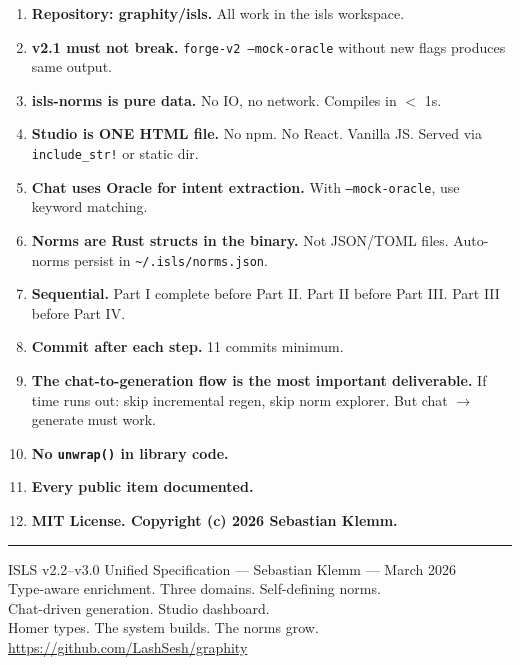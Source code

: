 \documentclass[11pt,a4paper]{article}
\begin{document}
\begin{enumerate}
\item \textbf{Repository: graphity/isls.} All work in the isls workspace.
\item \textbf{v2.1 must not break.} \texttt{forge-v2 --mock-oracle}
  without new flags produces same output.
\item \textbf{isls-norms is pure data.} No IO, no network. Compiles
  in $<$ 1s.
\item \textbf{Studio is ONE HTML file.} No npm. No React. Vanilla JS.
  Served via \texttt{include\_str!} or static dir.
\item \textbf{Chat uses Oracle for intent extraction.} With
  \texttt{--mock-oracle}, use keyword matching.
\item \textbf{Norms are Rust structs in the binary.} Not JSON/TOML
  files. Auto-norms persist in \texttt{\textasciitilde/.isls/norms.json}.
\item \textbf{Sequential.} Part I complete before Part II. Part II
  before Part III. Part III before Part IV.
\item \textbf{Commit after each step.} 11 commits minimum.
\item \textbf{The chat-to-generation flow is the most important
  deliverable.} If time runs out: skip incremental regen, skip
  norm explorer. But chat $\to$ generate must work.
\item \textbf{No \texttt{unwrap()} in library code.}
\item \textbf{Every public item documented.}
\item \textbf{MIT License. Copyright (c) 2026 Sebastian Klemm.}
\end{enumerate}

\vfill
\noindent\rule{\textwidth}{0.4pt}
\begin{center}
\small
ISLS v2.2--v3.0 Unified Specification --- Sebastian Klemm --- March 2026\\
Type-aware enrichment. Three domains. Self-defining norms.\\
Chat-driven generation. Studio dashboard.\\
Homer types. The system builds. The norms grow.\\
\url{https://github.com/LashSesh/graphity}
\end{center}
\end{document}
